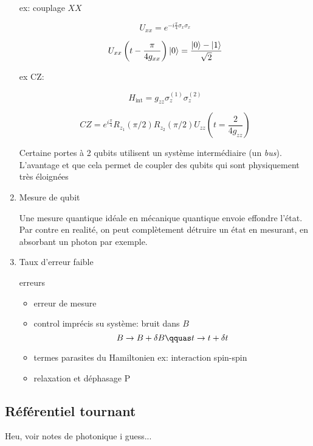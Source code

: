 \begin{enumerate}
ex: couplage $XX$ 

\[ U_{xx} = e^{-i \frac{\pi}{4} \sigma_x \sigma_x} \] 


\[ U_{xx}\left( t- \frac{\pi}{4g_{xx} } \right)  \ket{0} = \frac{\ket{0}-\ket{1}}{\sqrt{2}}  \] 


ex CZ:

\[ H_{\text{int}} = g_{zz} \sigma_z^{(1)} \sigma_z^{(2)}  \] 

\[ CZ = e^{i\frac{\pi}{4} } R_{z_1} \left( \pi/2 \right) R_{z_2} \left( \pi/2 \right)  U_{zz} \left( t = \frac{2}{4g_{zz} }   \right)  \] 

Certaine portes à 2 qubits utilisent un système intermédiaire (un \textit{bus}). L'avantage et que cela permet de coupler des qubits qui sont physiquement très éloignées


\item Mesure de qubit

	Une mesure quantique idéale en mécanique quantique envoie effondre l'état. Par contre en realité, on peut complètement détruire un état en mesurant, en absorbant un photon par exemple.


\item Taux d'erreur faible

erreurs \begin{itemize}
	\item erreur de mesure
	\item control imprécis su système: bruit dans $B$ 
		\[ B \to B + \delta B \qquas t \to t + \delta t \] 
	\item termes parasites du Hamiltonien 
		ex: interaction spin-spin  
	\item relaxation et déphasage P
\end{itemize}
\end{enumerate}

\subsection{Référentiel tournant}

Heu, voir notes de photonique i guess...






